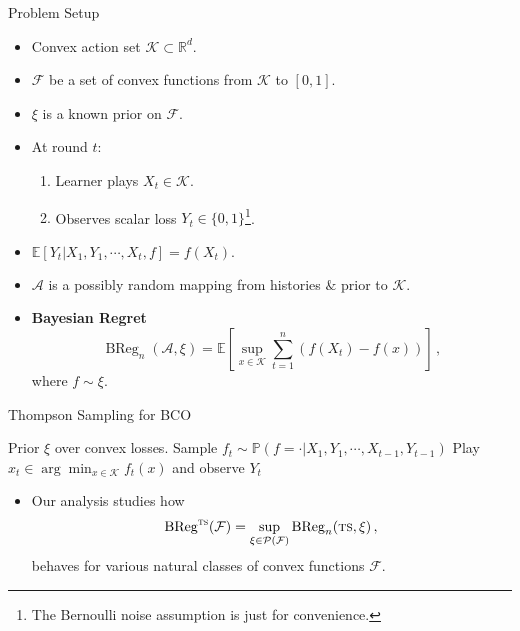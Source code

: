 \documentclass{beamer}
\newcommand{\BReg}{\operatorname{BReg}}
\newcommand{\E}{\mathbb{E}}
\newcommand{\PP}{\mathbb{P}}
\newcommand{\cK}{\mathcal{K}}
\newcommand{\cF}{\mathcal{F}}
\newcommand{\cA}{\mathcal{A}}
\newcommand{\cP}{\mathcal{P}}
\newcommand{\ts}{{\textsc{ts}}}
\begin{document}
\begin{frame}{Problem Setup}
    \begin{itemize}
        \item Convex action set \( \cK \subset \mathbb{R}^d \).
        \item $\cF$ be a set of convex functions from $\cK$ to $[0,1]$.
        \item $\xi$ is a known prior on $\cF$.
        \item At round \(t\):
              \begin{enumerate}
                  \item Learner plays \(X_t \in \cK\).
                  \item Observes scalar loss \( Y_t \in \{0,1\}\)\footnote{The Bernoulli noise assumption is just for convenience.}.
              \end{enumerate}
        \item $\E\left[Y_t|X_1, Y_1, \cdots, X_t, f\right] = f(X_t).$
        \item $\cA$ is a possibly random mapping from histories $\&$ prior to $\cK$.
        \item \textbf{Bayesian Regret}
              \[
                  \BReg_n(\cA, \xi) =
                  \E\left[
                      \sup_{x \in \cK}
                      \sum_{t=1}^n (f(X_t) - f(x))
                      \right]\,,
              \]
              where $f\sim \xi$.
    \end{itemize}
\end{frame}

\begin{frame}{Thompson Sampling for BCO}
    \begin{algorithm}[H]
        \caption{Thompson Sampling}
        \begin{algorithmic}[1]
            \State Prior \( \xi \) over convex losses.
            \State Sample \(f_t \sim \PP(f=\cdot|X_1, Y_1, \cdots, X_{t-1}, Y_{t-1})\)
            \State Play \( x_t \in \arg\min_{x\in\cK} f_t(x) \) and observe $Y_t$
            \EndFor
        \end{algorithmic}
    \end{algorithm}
    \begin{itemize}
        \item Our analysis studies how
              \[
                  \BReg^{\ts}(\cF) = \sup_{\xi \in \cP(\cF)} \BReg_n(\ts, \xi)\,,
              \]
              behaves for various natural classes of convex functions $\cF$.
    \end{itemize}
\end{frame}
\end{document}
